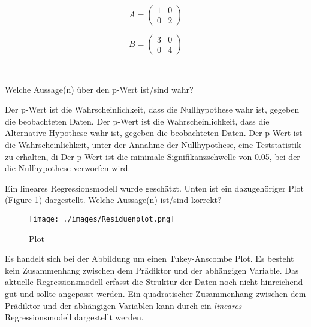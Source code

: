 \documentclass[10pt,addpoints]{exam}
\begin{document}
\begin{questions}
\begin{minipage}{.3\linewidth}
\[ A = \begin{pmatrix}
1 & 0 \\
0 & 2
\end{pmatrix} \]
\end{minipage}%
\begin{minipage}{.3\linewidth}
\[ B = \begin{pmatrix}
3 & 0 \\
0 & 4
\end{pmatrix} \]
\end{minipage}
\\

\question Welche Aussage(n) über den p-Wert ist/sind wahr?
\begin{choices}
\choice Der p-Wert ist die Wahrscheinlichkeit, dass die Nullhypothese wahr ist, gegeben die beobachteten Daten.
\choice Der p-Wert ist die Wahrscheinlichkeit, dass die Alternative Hypothese wahr ist, gegeben die beobachteten Daten.
\CorrectChoice Der p-Wert ist die Wahrscheinlichkeit, unter der Annahme der Nullhypothese, eine Teststatistik zu erhalten, di
\choice Der p-Wert ist die minimale Signifikanzschwelle von 0.05, bei der die Nullhypothese verworfen wird.
\end{choices}

\question Ein lineares Regressionsmodell wurde geschätzt. Unten ist ein dazugehöriger Plot (Figure \ref{fig:residuenplot}) dargestellt. Welche Aussage(n) ist/sind  korrekt?

\begin{figure}[H]
\centering
\texttt{[image: ./images/Residuenplot.png]}
\caption{Plot}
\label{fig:residuenplot}
\end{figure}


\begin{choices}
\CorrectChoice Es handelt sich bei der Abbildung um einen Tukey-Anscombe Plot.
\choice Es besteht kein Zusammenhang zwischen dem Prädiktor und der abhängigen Variable. 
\CorrectChoice Das aktuelle Regressionsmodell erfasst die Struktur der Daten noch nicht hinreichend gut und sollte angepasst werden.
\CorrectChoice Ein quadratischer Zusammenhang zwischen dem Prädiktor und der abhängigen Variablen kann durch ein \textit{lineares} Regressionsmodell dargestellt werden.
\end{choices}


\end{questions}
\end{document}
